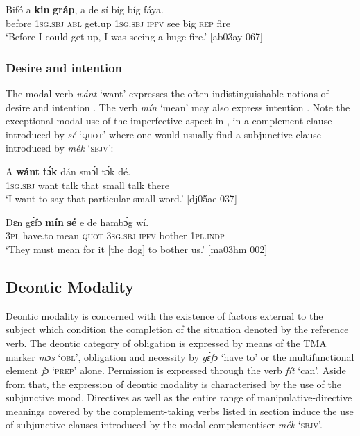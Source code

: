 \ea%
    \label{ex:key:411}
    \gll Bifó    a    \textbf{kin}  \textbf{gráp},  a    de  sí  bíg  bíg  fáya.\\
before  \textsc{1sg.sbj}  \textsc{abl}  get.up  \textsc{1sg.sbj}  \textsc{ipfv}  see  big  \textsc{rep}  fire\\

\glt ‘Before I could get up, I was seeing a huge fire.’ [ab03ay 067]
\z

\subsubsection{Desire and intention}\label{sec:6.7.2.2}

The modal verb \textit{wánt} ‘want’ expresses the often indistinguishable notions of desire and intention . The verb \textit{mín} ‘mean’ may also express intention . Note the exceptional modal use of the imperfective aspect in , in a complement clause introduced by \textit{sé} ‘\textsc{quot}’ where one would usually find a subjunctive clause introduced by \textit{mék} ‘\textsc{sbjv}’:


\ea%
    \label{ex:key:412}
    \gll \MakeUppercase{A}   \textbf{wánt}  \textbf{tɔ́k}  dán  smɔ́l  tɔ́k  dé.\\
\textsc{1sg.sbj}  want  talk  that  small  talk  there\\

\glt ‘I want to say that particular small word.’ [dj05ae 037]
\z


\ea%
    \label{ex:key:413}
    \gll Dɛn  gɛ́fɔ    \textbf{mín}    \textbf{sé}    e    de  hambɔ́g  wí.\\
\textsc{3pl}  have.to  mean  \textsc{quot}    \textsc{3sg.sbj}  \textsc{ipfv}  bother  \textsc{1pl.indp}\\

\glt ‘They must mean for it [the dog] to bother us.’ [ma03hm 002]
\z

\subsection{Deontic Modality} 

Deontic modality is concerned with the existence of factors external to the subject which condition the completion of the situation denoted by the reference verb. The deontic category of obligation is expressed by means of the TMA marker \textit{mɔs} ‘\textsc{obl}’, obligation and necessity by \textit{gɛ́fɔ} ‘have to’ or the multifunctional element \textit{fɔ} ‘\textsc{prep}’ alone. Permission is expressed through the verb \textit{fít} ‘can’. Aside from that, the expression of deontic modality is characterised by the use of the subjunctive mood. Directives{\fff} as well as the entire range of manipulative-directive meanings covered by the complement-taking verbs listed in section  induce the use of subjunctive clauses introduced by the modal complementiser \textit{mék} ‘\textsc{sbjv}’. 

